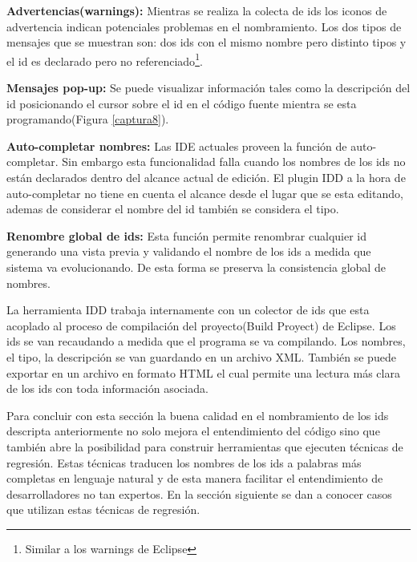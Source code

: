\documentclass[12pt]{report}
\begin{document}
\textbf{Advertencias(warnings):} Mientras se realiza la colecta de ids los iconos de advertencia indican potenciales problemas en el nombramiento.  Los dos tipos de mensajes que se muestran son: dos ids con el mismo nombre pero distinto tipos y el id es declarado pero no referenciado\footnote[1]{Similar a los warnings de Eclipse}.



\textbf{Mensajes pop-up:} Se puede visualizar información tales como la descripción del id posicionando el cursor sobre el id en el código fuente mientra se esta programando(Figura \ref{captura8}).

\textbf{Auto-completar nombres:} Las IDE actuales proveen la función de auto-completar. Sin embargo esta funcionalidad falla cuando los nombres de los ids no están declarados dentro del alcance actual de edición. El plugin IDD a la hora de auto-completar no tiene en cuenta el alcance desde el lugar que se esta editando, ademas de considerar el nombre del id también se considera el tipo.


\textbf{Renombre global de ids:} Esta función permite renombrar cualquier id generando una vista previa y validando el nombre de los ids a medida que sistema va evolucionando. De esta forma se preserva la consistencia global de nombres.

La herramienta IDD trabaja internamente con un colector de ids que esta acoplado al proceso de compilación del proyecto(Build Proyect) de Eclipse. Los ids se van recaudando a medida que el programa se va compilando. Los nombres, el tipo, la descripción se van guardando en un archivo XML. También se puede exportar en un archivo en formato HTML el cual permite una lectura más clara de los ids con toda información asociada\cite{DFPM05}.



Para concluir con esta sección la buena calidad en el nombramiento de los ids descripta anteriormente no solo mejora el entendimiento del código sino que también abre la posibilidad para construir herramientas que ejecuten técnicas de regresión. Estas técnicas  traducen los nombres de los ids a palabras más completas en lenguaje natural y de esta manera facilitar el entendimiento de desarrolladores no tan expertos. En la sección siguiente se dan a conocer casos que utilizan estas técnicas de regresión.
\end{document}
